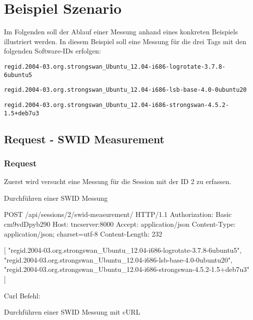 \documentclass[10pt,a4paper]{scrartcl}
\begin{document}
\pagebreak
\section{Beispiel Szenario}
Im Folgenden soll der Ablauf einer Messung anhand eines konkreten Beispiels
illustriert werden. In diesem Beispiel soll eine Messung für die drei Tags mit
den folgenden Software-IDs erfolgen:
\begin{itemize*}
	\item \texttt{regid.2004-03.org.strongswan\_Ubuntu\_12.04-i686-logrotate-3.7.8-6ubuntu5}
	\item \texttt{regid.2004-03.org.strongswan\_Ubuntu\_12.04-i686-lsb-base-4.0-0ubuntu20}
	\item \texttt{regid.2004-03.org.strongswan\_Ubuntu\_12.04-i686-strongswan-4.5.2-1.5+deb7u3}
\end{itemize*}

\subsection{Request - SWID Measurement}

\subsubsection{Request}

Zuerst wird versucht eine Messung für die Session mit der ID 2 zu erfassen.

\begin{listing}
\caption{Durchführen einer SWID Messung}
\begin{httpcode}
POST /api/sessions/2/swid-measurement/ HTTP/1.1
Authorization: Basic cm9vdDpyb290
Host: tncserver:8000
Accept: application/json
Content-Type: application/json; charset=utf-8
Content-Length: 232

[
"regid.2004-03.org.strongswan_Ubuntu_12.04-i686-logrotate-3.7.8-6ubuntu5",
"regid.2004-03.org.strongswan_Ubuntu_12.04-i686-lsb-base-4.0-0ubuntu20",
"regid.2004-03.org.strongswan_Ubuntu_12.04-i686-strongswan-4.5.2-1.5+deb7u3"
]
\end{httpcode}
\end{listing}

Curl Befehl:

\begin{listing}
\caption{Durchführen einer SWID Messung mit cURL}
\end{listing}
\end{document}

